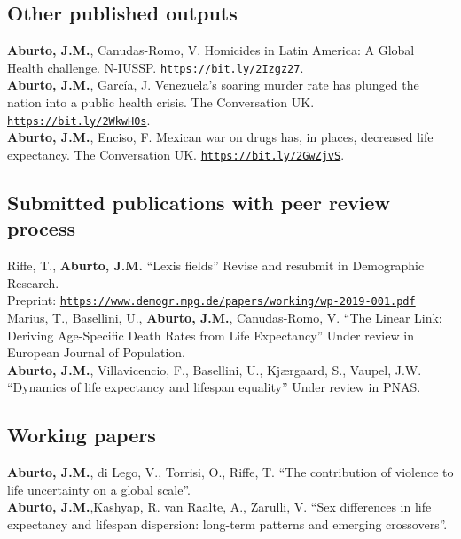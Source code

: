 \documentclass[12pt]{article}
\providecommand*\url[1]{\href{#1}{#1}}
\renewcommand*\url[1]{\href{#1}{\texttt{#1}}}
\begin{document}
\subsection*{Other published outputs}	

\textbf{Aburto, J.M.}, Canudas-Romo, V. Homicides in Latin America: A Global Health challenge. N-IUSSP. \url{https://bit.ly/2Izgz27}.\\

\textbf{Aburto, J.M.}, Garc\'ia, J. Venezuela's soaring murder rate has plunged the nation into a public health crisis. The Conversation UK. \url{https://bit.ly/2WkwH0s}.\\

\textbf{Aburto, J.M.}, Enciso, F. Mexican war on drugs has, in places, decreased life expectancy. The Conversation UK. \url{https://bit.ly/2GwZjvS}.\\


\subsection*{Submitted publications with peer review process}	
Riffe, T., \textbf{Aburto, J.M.} ``Lexis fields'' Revise and resubmit in Demographic Research. \\
Preprint: \url{https://www.demogr.mpg.de/papers/working/wp-2019-001.pdf}\\

Marius, T., Basellini, U., \textbf{Aburto, J.M.}, Canudas-Romo, V. ``The Linear Link: Deriving Age-Specific Death Rates from Life Expectancy'' Under review in European Journal of Population. \\

 
\textbf{Aburto, J.M.},  Villavicencio, F., Basellini, U., Kj{\ae}rgaard, S., Vaupel, J.W. ``Dynamics of life expectancy and lifespan equality'' Under review in PNAS. \\
 

 
\subsection*{Working papers}
 \textbf{Aburto, J.M.}, di Lego, V., Torrisi, O., Riffe, T. ``The contribution of violence to life uncertainty on a global scale''.\\

 \textbf{Aburto, J.M.},Kashyap, R. van Raalte, A., Zarulli, V. ``Sex differences in life expectancy and lifespan dispersion: long-term patterns and emerging crossovers''.\\
\end{document}
